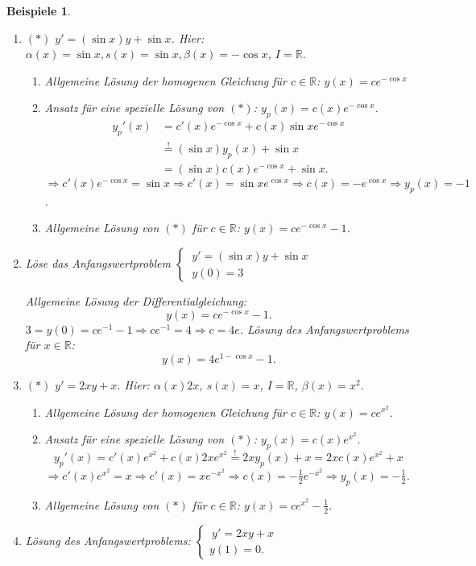 \documentclass[12pt]{extreport} %
\newcommand{\R}{\mathbb{R}}
\theoremstyle{named}
\theoremstyle{nnamed}
\theoremstyle{itshape}
\theoremstyle{normal}
\newtheorem*{beispiele}{Beispiele}
\begin{document}
\begin{beispiele} ~\
	\begin{enumerate}
		\item $(*)$ $y' = (\sin x) y + \sin x$. Hier: $\alpha(x) = \sin x, s(x) = \sin x, \beta(x) = - \cos x$, $I = \R$.
			\begin{enumerate}[label=\arabic*.]
				\item Allgemeine Lösung der homogenen Gleichung für $c \in \R$: $y(x) = c e^{-\cos x}$
				\item Ansatz für eine spezielle Lösung von $(*)$: $ y_{p}(x) = c(x) e^{-\cos x }$.
					\begin{align*}
						y_{p}'(x) & = c'(x) e^{-\cos x} + c(x) \sin x e^{- \cos x} \\
						& \overset{!}{=} \left( \sin x \right) y_{p}(x) + \sin x \\
						& = \left( \sin x \right) c(x) e^{-\cos x} + \sin x.
					\end{align*}
					$\Rightarrow c'(x) e^{-\cos x} = \sin x \Rightarrow c'(x) = \sin x e^{\cos x} \Rightarrow c(x) = - e^{\cos x} \Rightarrow y_{p}(x) = -1$.
				\item Allgemeine Lösung von $(*)$ für $c \in \R$: $y(x) = c e^{-\cos x} - 1$.
			\end{enumerate}
		\item Löse das Anfangswertproblem $\begin{cases} ~ y' = \left( \sin x \right) y + \sin x \\ ~ y(0) = 3 \end{cases}$
		
			\bigskip
		
			Allgemeine Lösung der Differentialgleichung: 
						$$ y(x) = c e^{- \cos x } - 1. $$
					$3 = y(0) = c e^{-1} - 1 \Rightarrow c e^{-1} = 4 \Rightarrow c = 4e$. Lösung des Anfangswertproblems für $x \in \R$:
					$$ y(x) = 4 e^{1-\cos x} - 1. $$
		\item $(*)$ $y' = 2 xy + x$. Hier: $\alpha(x) 2x$, $s(x) = x$, $I = \R$, $\beta(x) = x^{2}$.
			\begin{enumerate}[label=\arabic*.]
				\item Allgemeine Lösung der homogenen Gleichung für $c \in \R$: $y(x) = c e^{x^{2}}$.
				\item Ansatz für eine spezielle Lösung von $(*)$: $y_{p}(x) = c(x) e^{x^{2}}$.
					$$ y_{p}'(x) = c'(x) e^{x^{2}} + c(x) 2x e^{x^{2}} \overset{!}{=} 2 x y_{p}(x) + x = 2x c(x) e^{x^{2}} + x $$
					$\Rightarrow c'(x) e^{x^{2}} = x \Rightarrow c'(x) = x e^{-x^{2}} \Rightarrow c(x) = - \frac{1}{2} e^{-x^{2}} \Rightarrow y_{p}(x) = -\frac{1}{2}$.
				\item Allgemeine Lösung von $(*)$ für $c \in \R$: $y(x) = c e^{x^{2}} - \frac{1}{2}$.
			\end{enumerate}
		\item Lösung des Anfangswertproblems: $\begin{cases} ~y' = 2xy + x \\ y(1) = 0. \end{cases}$ 
		

\end{enumerate}
\end{beispiele}
\end{document}
